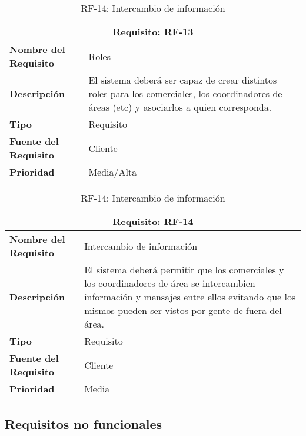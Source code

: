 \begin{table}[H]
\begin{table}[H]
\begin{center}
\begin{tabular}{p{} p{7cm}}
\multicolumn{2}{c}{\textbf{Requisito: RF-13} } \\
\hline \hline
\textbf{Nombre del Requisito} &  Roles \\
\hline
\textbf{Descripción} & El sistema deberá ser capaz de crear distintos roles para los comerciales, los coordinadores de áreas (etc) y asociarlos a quien corresponda. \\
\hline
\textbf{Tipo} & Requisito  \\
\hline
\textbf{Fuente del Requisito} & Cliente  \\
\hline
\textbf{Prioridad} & Media/Alta  \\ \hline
\end{tabular}
\caption{RF-13: Roles}
\label{tab:RF13}
\end{center}
\end{table}

\begin{table}[H]
\begin{center}
\begin{tabular}{p{} p{7cm}}
\multicolumn{2}{c}{\textbf{Requisito: RF-14} } \\
\hline \hline
\textbf{Nombre del Requisito} & Intercambio de información  \\
\hline
\textbf{Descripción} & El sistema deberá permitir que los comerciales y los coordinadores de área se intercambien información y mensajes entre ellos evitando que los mismos pueden ser vistos por gente de fuera del área. \\
\hline
\textbf{Tipo} & Requisito  \\
\hline
\textbf{Fuente del Requisito} & Cliente  \\
\hline
\textbf{Prioridad} & Media  \\ \hline
\end{tabular}
\caption{RF-14: Intercambio de información}
\label{tab:RF-14}
\end{center}
\end{table}




\subsection{Requisitos no funcionales}


\end{table}
